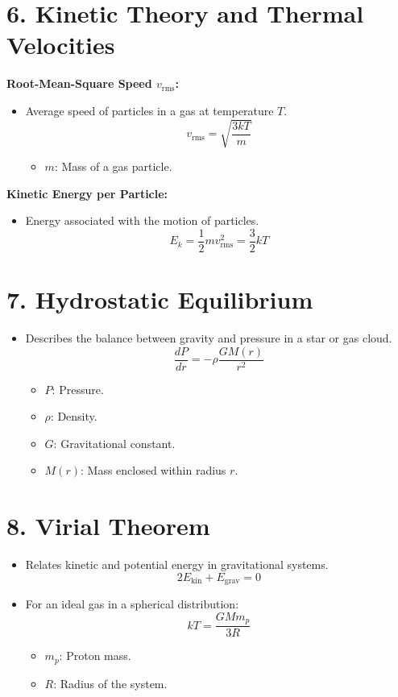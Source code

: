 \documentclass{article}
\begin{document}
\section*{6. Kinetic Theory and Thermal Velocities}

\textbf{Root-Mean-Square Speed \( v_{\text{rms}} \):}
\begin{itemize}
    \item Average speed of particles in a gas at temperature \( T \).
          \[
              v_{\text{rms}} = \sqrt{\frac{3 k T}{m}}
          \]
          \begin{itemize}
              \item \( m \): Mass of a gas particle.
          \end{itemize}
\end{itemize}

\textbf{Kinetic Energy per Particle:}
\begin{itemize}
    \item Energy associated with the motion of particles.
          \[
              E_k = \frac{1}{2} m v_{\text{rms}}^2 = \frac{3}{2} k T
          \]
\end{itemize}

\section*{7. Hydrostatic Equilibrium}

\begin{itemize}
    \item Describes the balance between gravity and pressure in a star or gas cloud.
          \[
              \frac{dP}{dr} = -\rho \frac{G M(r)}{r^2}
          \]
          \begin{itemize}
              \item \( P \): Pressure.
              \item \( \rho \): Density.
              \item \( G \): Gravitational constant.
              \item \( M(r) \): Mass enclosed within radius \( r \).
          \end{itemize}
\end{itemize}

\section*{8. Virial Theorem}

\begin{itemize}
    \item Relates kinetic and potential energy in gravitational systems.
          \[
              2 E_{\text{kin}} + E_{\text{grav}} = 0
          \]
    \item For an ideal gas in a spherical distribution:
          \[
              k T = \frac{G M m_p}{3 R}
          \]
          \begin{itemize}
              \item \( m_p \): Proton mass.
              \item \( R \): Radius of the system.
          \end{itemize}
\end{itemize}
\end{document}
